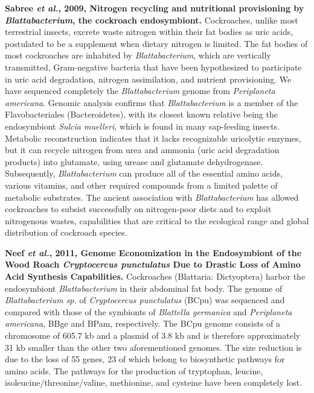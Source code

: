 \documentclass[11pt]{article}
\begin{document}
\begin{sloppypar}
\par
\textbf{Sabree \textit{et al.}, 2009, Nitrogen recycling and nutritional provisioning by \textit{Blattabacterium}, the cockroach endosymbiont.} \newline
Cockroaches, unlike most terrestrial insects, excrete waste nitrogen within their fat bodies as uric acids, postulated to be a supplement when dietary nitrogen is limited. 
The fat bodies of most cockroaches are inhabited by \textit{Blattabacterium}, which are vertically transmitted, Gram-negative bacteria that have been hypothesized to participate in uric acid degradation, nitrogen assimilation, and nutrient provisioning. 
We have sequenced completely the \textit{Blattabacterium} genome from \textit{Periplaneta americana}. 
Genomic analysis confirms that \textit{Blattabacterium} is a member of the Flavobacteriales (Bacteroidetes), with its closest known relative being the endosymbiont \textit{Sulcia muelleri}, which is found in many sap-feeding insects. 
Metabolic reconstruction indicates that it lacks recognizable uricolytic enzymes, but it can recycle nitrogen from urea and ammonia (uric acid degradation products) into glutamate, using urease and glutamate dehydrogenase. 
Subsequently, \textit{Blattabacterium} can produce all of the essential amino acids, various vitamins, and other required compounds from a limited palette of metabolic substrates. 
The ancient association with \textit{Blattabacterium} has allowed cockroaches to subsist successfully on nitrogen-poor diets and to exploit nitrogenous wastes, capabilities that are critical to the ecological range and global distribution of cockroach species.
\par
\textbf{Neef \textit{et al.}, 2011, Genome Economization in the Endosymbiont of the Wood Roach \textit{Cryptocercus punctulatus} Due to Drastic Loss of Amino Acid Synthesis Capabilities.} \newline
Cockroaches (Blattaria: Dictyoptera) harbor the endosymbiont \textit{Blattabacterium} in their abdominal fat body. 
The genome of \textit{Blattabacterium sp.} of \textit{Cryptocercus punctulatus} (BCpu) was sequenced and compared with those of the symbionts of \textit{Blattella germanica} and \textit{Periplaneta americana}, BBge and BPam, respectively. 
The BCpu genome consists of a chromosome of 605.7 kb and a plasmid of 3.8 kb and is therefore approximately 31 kb smaller than the other two aforementioned genomes. 
The size reduction is due to the loss of 55 genes, 23 of which belong to biosynthetic pathways for amino acids. 
The pathways for the production of tryptophan, leucine, isoleucine/threonine/valine, methionine, and cysteine have been completely lost. 

\end{sloppypar}
\end{document}
